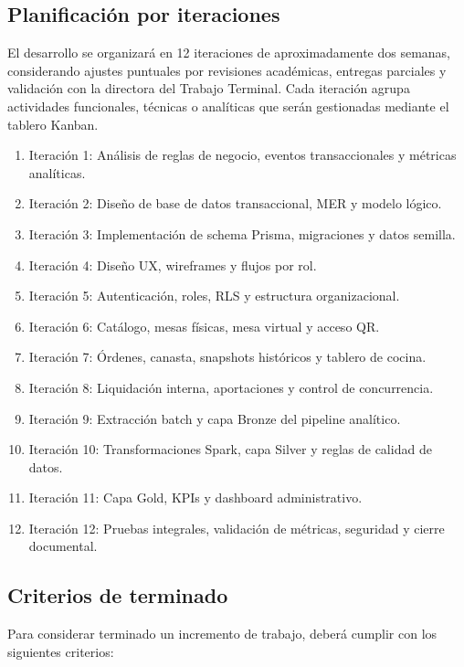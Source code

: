 \subsection{Planificación por iteraciones}

El desarrollo se organizará en 12 iteraciones de aproximadamente dos semanas,
considerando ajustes puntuales por revisiones académicas, entregas parciales y
validación con la directora del Trabajo Terminal. Cada iteración agrupa actividades
funcionales, técnicas o analíticas que serán gestionadas mediante el tablero Kanban.

\begin{enumerate}[leftmargin=*, itemsep=1pt, topsep=2pt]
  \item Iteración 1: Análisis de reglas de negocio, eventos transaccionales y métricas analíticas.
  \item Iteración 2: Diseño de base de datos transaccional, MER y modelo lógico.
  \item Iteración 3: Implementación de schema Prisma, migraciones y datos semilla.
  \item Iteración 4: Diseño UX, wireframes y flujos por rol.
  \item Iteración 5: Autenticación, roles, RLS y estructura organizacional.
  \item Iteración 6: Catálogo, mesas físicas, mesa virtual y acceso QR.
  \item Iteración 7: Órdenes, canasta, snapshots históricos y tablero de cocina.
  \item Iteración 8: Liquidación interna, aportaciones y control de concurrencia.
  \item Iteración 9: Extracción batch y capa Bronze del pipeline analítico.
  \item Iteración 10: Transformaciones Spark, capa Silver y reglas de calidad de datos.
  \item Iteración 11: Capa Gold, KPIs y dashboard administrativo.
  \item Iteración 12: Pruebas integrales, validación de métricas, seguridad y cierre documental.
\end{enumerate}

\subsection{Criterios de terminado}

Para considerar terminado un incremento de trabajo, deberá cumplir con los siguientes
criterios:

